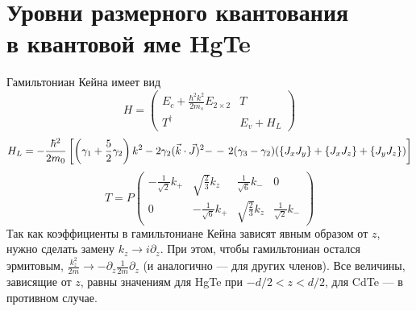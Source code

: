 \newpage
\section{Уровни размерного квантования\\ в квантовой яме HgTe}
\label{app:dim_quant}
Гамильтониан Кейна имеет вид
\begin{equation}
    \label{kane_ham}
    H = \begin{pmatrix}
                E_c + \frac{\hbar^2 k^2}{2m_s}E_{2\times 2} & T \\
                T^\dagger & E_v + H_{L}
        \end{pmatrix}
\end{equation}
\begin{equation*}
    H_L = -\frac{\hbar^2}{2m_0}\left[
            \left(\gamma_1 + \frac{5}{2}\gamma_2\right)k^2 -
            2\gamma_2(\vec{k} \cdot \vec{J})^2 - \right. 
            - \left.2(\gamma_3 - \gamma_2)(\{J_x J_y\} + \{J_x J_z\} + \{J_y J_z\})
            \vphantom{\frac{1}{2}}\right]
\end{equation*}
\begin{equation*}
    T = P\begin{pmatrix}
           -\frac{1}{\sqrt{2}}k_{+} & \sqrt{\frac{2}{3}}k_z  
                    & \frac{1}{\sqrt{6}} k_{-} & 0 \\
            0 & -\frac{1}{\sqrt{6}} k_{+} 
                    & \sqrt{\frac{2}{3}}k_z & \frac{1}{\sqrt{2}} k_{-} 
         \end{pmatrix}
\end{equation*}
Так как
коэффициенты в гамильтониане Кейна зависят явным образом от $z$, нужно сделать замену
$k_z \to i\partial_z$. При этом, чтобы гамильтониан остался эрмитовым,
$\frac{k_z^2}{2m} \to -\partial_z \frac{1}{2m} \partial_z$ (и аналогично --- для других
членов). Все величины, зависящие от $z$, равны значениям для HgTe при $-d/2 < z < d/2$,
для CdTe --- в противном случае.

